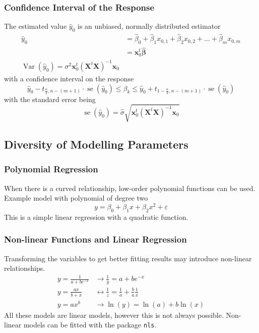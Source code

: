 \documentclass[11pt]{article}
\theoremstyle{definition}
\newcommand*\Var[1]{\mathop{\text{Var}}\left(#1\right)}
\newcommand*\se[1]{\mathop{\text{se}}\left(#1\right)}
\begin{document}
\subsubsection{Confidence Interval of the Response}
The estimated value $\hat{y}_0$ is an unbiased, normally distributed estimator
\begin{align*}
	\hat{y}_0 &= \hat{\beta}_0 + \hat{\beta}_1 x_{0,1} + \hat{\beta}_2 x_{0,2} + \dots + \hat{\beta}_m x_{0,m}\\
	&=\bm{x}_0^t \hat{\bm{\beta}}\\
	\Var{\hat{y}_0} = \sigma^2 \bm{x}_0^t(\bm{X}^t\bm{X})^{-1}\bm{x}_0
\end{align*}
with a confidence interval on the response
\begin{equation*}
	\hat{y}_0 - t_{\frac{\alpha}{2},n-(m+1)}\cdot\se{\hat{y}_0} \leq \beta_k \leq \hat{y}_0 + t_{1 - \frac{\alpha}{2},n-(m+1)}\cdot\se{\hat{y}_0}
\end{equation*}
with the standard error being
\begin{equation*}
	\se{\hat{y}_0} = \hat{\sigma}\sqrt{\bm{x}_0^t(\bm{X}^t\bm{X})^{-1}\bm{x}_0}
\end{equation*}




\subsection{Diversity of Modelling Parameters}

\subsubsection{Polynomial Regression}
When there is a curved relationship, low-order polynomial functions can be used. Example model with polynomial of degree two
\begin{equation*}
	y = \beta_0 + \beta_1 x + \beta_2 x^2 + \varepsilon
\end{equation*}
This is a simple linear regression with a quadratic function.

\subsubsection{Non-linear Functions and Linear Regression}
Transforming the variables to get better fitting results may introduce non-linear relationships.
\begin{align*}
	y = \frac{1}{a+be^{-x}} &\longrightarrow \frac{1}{y} = a + be^{-x}\\
	y = \frac{ax}{b+x} &\longleftrightarrow \frac{1}{z} = \frac{1}{a} + \frac{b}{a}\frac{1}{x}\\
	y = ax^b &\longrightarrow \ln{(y)} = \ln{(a)} + b\ln{(x)}
\end{align*}
All these models are linear models, however this is not always possible. Non-linear models can be fitted with the package \texttt{nls}.
\end{document}
